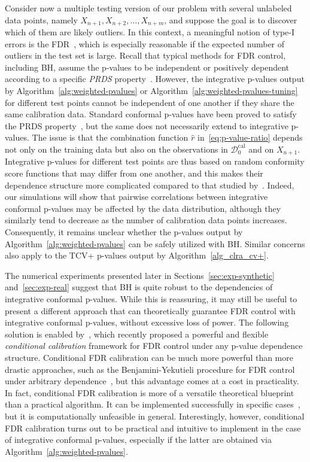\documentclass[11pt]{article}
\begin{document}
Consider now a multiple testing version of our problem with several unlabeled data points, namely $X_{n+1}, X_{n+2}, \ldots, X_{n+m}$, and suppose the goal is to discover which of them are likely outliers. In this context, a meaningful notion of type-I errors is the FDR~\cite{benjamini1995controlling}, which is especially reasonable if the expected number of outliers in the test set is large.
Recall that typical methods for FDR control, including BH, assume the p-values to be independent or positively dependent according to a specific {\it PRDS} property~\cite{benjamini2001control}. However, the integrative p-values output by Algorithm~\ref{alg:weighted-pvalues} or Algorithm~\ref{alg:weighted-pvalues-tuning} for different test points cannot be independent of one another if they share the same calibration data.
Standard conformal p-values have been proved to satisfy the PRDS property~\cite{bates2021testing}, but the same does not necessarily extend to integrative p-values.
The issue is that the combination function $\hat{r}$ in~\eqref{eq:p-value-ratio} depends not only on the training data but also on the observations in $\mathcal{D}_0^{\mathrm{cal}}$ and on $X_{n+1}$.
Integrative p-values for different test points are thus based on random conformity score functions that may differ from one another, and this makes their dependence structure more complicated compared to that studied by~\cite{bates2021testing}.
Indeed, our simulations will show that pairwise correlations between integrative conformal p-values may be affected by the data distribution, although they similarly tend to decrease as the number of calibration data points increases.
Consequently, it remains unclear whether the p-values output by Algorithm~\ref{alg:weighted-pvalues} can be safely utilized with BH.
Similar concerns also apply to the TCV+ p-values output by Algorithm~\ref{alg_clra_cv+}.


The numerical experiments presented later in Sections~\ref{sec:exp-synthetic} and~\ref{sec:exp-real} suggest that BH is quite robust to the dependencies of integrative conformal p-values. 
While this is reassuring, it may still be useful to present a different approach that can theoretically guarantee FDR control with integrative conformal p-values, without excessive loss of power.
The following solution is enabled by~\cite{2020conditionalcalibration}, which recently proposed a powerful and flexible {\it conditional calibration} framework for FDR control under any p-value dependence structure. 
Conditional FDR calibration can be much more powerful than more drastic approaches, such as the Benjamini-Yekutieli procedure for FDR control under arbitrary dependence~\cite{benjamini2001control}, but this advantage comes at a cost in practicality. In fact, conditional FDR calibration is more of a versatile theoretical blueprint than a practical algorithm. It can be implemented successfully in specific cases~\cite{2020conditionalcalibration}, but it is computationally unfeasible in general.
Interestingly, however, conditional FDR calibration turns out to be practical and intuitive to implement in the case of integrative conformal p-values, especially if the latter are obtained via Algorithm~\ref{alg:weighted-pvalues}.
\end{document}
